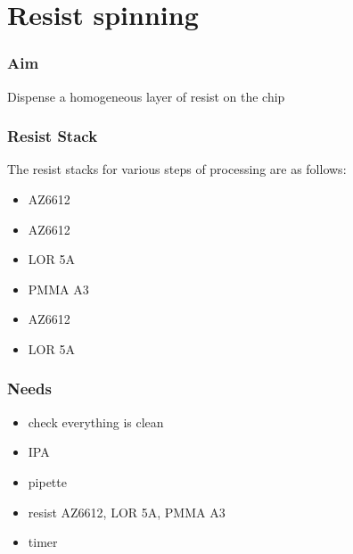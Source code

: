 \documentclass[12pt,a4paper]{report}
\begin{document}
\newpage

\section{Resist spinning}

\subsubsection{Aim}
Dispense a homogeneous layer of resist on the chip

\subsubsection{Resist Stack}
The resist stacks for various steps of processing are as follows:
\begin{description}[noitemsep, nolistsep, leftmargin=\parindent, labelindent=\parindent]
\item[Mesa Etch] \hfill
  \begin{itemize} [noitemsep, nolistsep]
    \item AZ6612
  \end{itemize}
\item[Ohmics] \hfill
  \begin{itemize} [noitemsep, nolistsep]
    \item AZ6612
    \item LOR 5A
  \end{itemize}
\item[Fine Gates] \hfill
  \begin{itemize} [noitemsep, nolistsep]
    \item PMMA A3
  \end{itemize}
\item[Optical Gates] \hfill
  \begin{itemize} [noitemsep, nolistsep]
    \item AZ6612
    \item LOR 5A
  \end{itemize}
\end{description}

\subsubsection{Needs}
\begin{itemize} [noitemsep]
\item check everything is clean
\item IPA
\item pipette
\item resist AZ6612, LOR 5A, PMMA A3
\item timer
\end{itemize}
\end{document}
